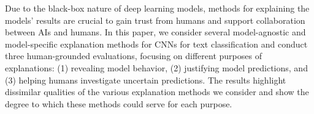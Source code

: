 Due to the black-box nature of deep learning models, methods for explaining the models' results are crucial to gain trust from humans and support collaboration between AIs and humans. In this paper, we consider several model-agnostic and model-specific explanation methods for CNNs for text classification and conduct three human-grounded evaluations, focusing on different purposes of explanations: (1) revealing model behavior, (2) justifying model predictions, and (3) helping humans investigate uncertain predictions. The results highlight dissimilar qualities of the various explanation methods we consider and show the degree to which these methods could serve for each purpose.